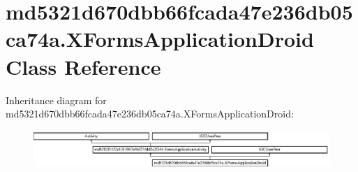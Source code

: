 \hypertarget{classmd5321d670dbb66fcada47e236db05ca74a_1_1XFormsApplicationDroid}{}\section{md5321d670dbb66fcada47e236db05ca74a.\+X\+Forms\+Application\+Droid Class Reference}
\label{classmd5321d670dbb66fcada47e236db05ca74a_1_1XFormsApplicationDroid}
Inheritance diagram for md5321d670dbb66fcada47e236db05ca74a.\+X\+Forms\+Application\+Droid\+:\begin{figure}[H]
\begin{center}
\leavevmode
\includegraphics[height=1.379310cm]{classmd5321d670dbb66fcada47e236db05ca74a_1_1XFormsApplicationDroid}
\end{center}
\end{figure}
